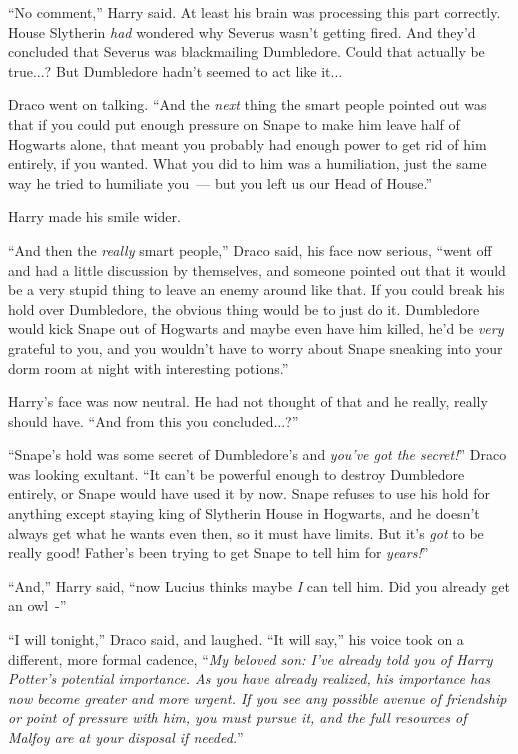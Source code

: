 ``No comment,'' Harry said. At least his brain was processing this part correctly. House Slytherin \emph{had} wondered why Severus wasn't getting fired. And they'd concluded that Severus was blackmailing Dumbledore. Could that actually be true...? But Dumbledore hadn't seemed to act like it...

Draco went on talking. ``And the \emph{next} thing the smart people pointed out was that if you could put enough pressure on Snape to make him leave half of Hogwarts alone, that meant you probably had enough power to get rid of him entirely, if you wanted. What you did to him was a humiliation, just the same way he tried to humiliate you~--- but you left us our Head of House.''

Harry made his smile wider.

``And then the \emph{really} smart people,'' Draco said, his face now serious, ``went off and had a little discussion by themselves, and someone pointed out that it would be a very stupid thing to leave an enemy around like that. If you could break his hold over Dumbledore, the obvious thing would be to just do it. Dumbledore would kick Snape out of Hogwarts and maybe even have him killed, he'd be \emph{very} grateful to you, and you wouldn't have to worry about Snape sneaking into your dorm room at night with interesting potions.''

Harry's face was now neutral. He had not thought of that and he really, really should have. ``And from this you concluded...?''

``Snape's hold was some secret of Dumbledore's and \emph{you've got the secret!}'' Draco was looking exultant. ``It can't be powerful enough to destroy Dumbledore entirely, or Snape would have used it by now. Snape refuses to use his hold for anything except staying king of Slytherin House in Hogwarts, and he doesn't always get what he wants even then, so it must have limits. But it's \emph{got} to be really good! Father's been trying to get Snape to tell him for \emph{years!}''

``And,'' Harry said, ``now Lucius thinks maybe \emph{I} can tell him. Did you already get an owl~-''

``I will tonight,'' Draco said, and laughed. ``It will say,'' his voice took on a different, more formal cadence, ``\emph{My beloved son: I've already told you of Harry Potter's potential importance. As you have already realized, his importance has now become greater and more urgent. If you see any possible avenue of friendship or point of pressure with him, you must pursue it, and the full resources of Malfoy are at your disposal if needed.}''

